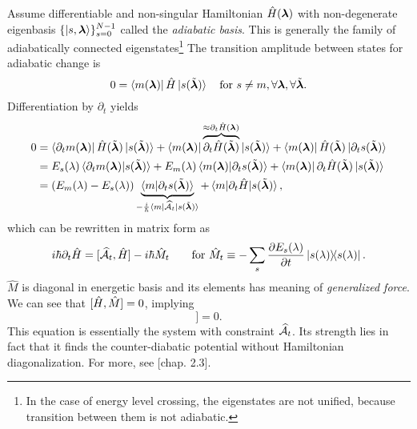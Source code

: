 Assume differentiable and non-singular Hamiltonian $\HH(\llambda)$ with non-degenerate eigenbasis $\{\ket{s,\llambda}\}_{s=0}^{N-1}$ called the \emph{adiabatic basis}. This is generally the family of adiabatically connected eigenstates\footnote{In the case of energy level crossing, the eigenstates are not unified, because transition between them is not adiabatic.} The transition amplitude between states for adiabatic change is
\begin{equation}
    0=\bra{m(\llambda)}\HH\ket{s(\tilde\llambda)} \quad \text{for }s\neq m, \forall \llambda,\forall \tilde \llambda.
\end{equation}
Differentiation by $\partial_t$ yields
\begin{equation}
    \begin{split}
        0&=\bra{\partial_t m(\llambda)}\HH(\tilde \llambda)\ket{s(\tilde\llambda)}+ \bra{m(\llambda)}\overbrace{\partial_t\HH(\tilde \llambda)}^{\approx \partial_t\HH(\llambda)}\ket{s(\tilde\llambda)}+ \bra{m(\llambda)}\HH(\tilde \llambda)\ket{\partial_t s(\tilde \llambda)}\\
        &=E_s(\lambda)\braket{\partial_t m(\llambda)|s(\tilde \llambda)} + E_m(\lambda)\braket{m(\llambda)|\partial_t s(\tilde \llambda)}+ \bra{m(\llambda)}\partial_t \HH(\tilde\llambda)\ket{s(\tilde \llambda)}\\
        &= (E_m(\lambda)-E_s(\lambda))\underbrace{\braket{m|\partial_t s(\tilde \llambda)}}_{-\frac{i}{\hbar}\bra{m}\AA_t\ket{s(\tilde \llambda)}} + \braket{m|\partial_t\HH|s(\tilde \llambda)},
    \end{split}
\end{equation}
which can be rewritten in matrix form as
\begin{equation}
    i\hbar\partial_t\HH=[\AA_t,\HH]-i\hbar \hat{M}_t\qquad \text{for } \hat{M}_t\equiv -\sum_s\pder{E_s(\lambda)}{t}\ket{s(\lambda)}\!\!\bra{s(\lambda)}.
\end{equation}
$\hat{M}$ is diagonal in energetic basis and its elements has meaning of \emph{generalized force}. We can see that $[\HH,\hat{M}]=0$, implying
\begin{equation}
    [\HH,i\hbar\partial_t\HH-[\AA_t,\HH]]=0.
    \label{eq:komutation}
\end{equation}
This equation is essentially the system with constraint $\AA_t$. Its strength lies in fact that it finds the counter-diabatic potential without Hamiltonian diagonalization. For more, see \cite{kolodrubez}[chap. 2.3].











